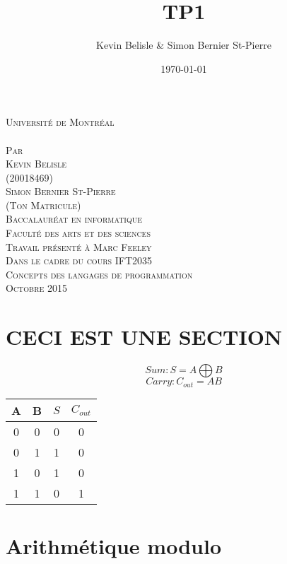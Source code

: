 \documentclass[a4paper,12pt]{article}
\date{\today}
\author{Kevin Belisle \& Simon Bernier St-Pierre}
\title{TP1}
\newcommand{\Teacher}{Marc Feeley}
\newcommand{\ClassNum}{IFT2035}
\newcommand{\ClassName}{Concepts des langages de programmation}
\newcommand{\DateMMMMYYYY}{Octobre 2015}
\newcommand{\Author}{Kevin Belisle}
\newcommand{\Authorr}{Simon Bernier St-Pierre}
\begin{document}
\begin{titlepage} 
	\begin{center}
		\textsc{\normalsize Université de Montréal}\\[2.5cm]
		
		\textsc{\LARGE \@title}\\[2.5cm]
		
		\textsc{\small Par}\\[0.25cm]
		\textsc{\LARGE \Author}\\[0.25cm]
		\textsc{\normalsize (20018469)}\\[0.25cm]
		\textsc{\LARGE \Authorr}\\[0.25cm]
		\textsc{\normalsize (Ton Matricule)}\\[2.5cm]
		
		\textsc{\normalsize Baccalauréat en informatique}\\
		\textsc{\normalsize Faculté des arts et des sciences}\\[2.5cm]
		
		\textsc{\small Travail présenté à \Teacher}\\
		\textsc{\small Dans le cadre du cours \ClassNum}\\
		\textsc{\small \ClassName}\\[2.5cm]
		
		\textsc{\normalsize \DateMMMMYYYY}\\[1.5cm]
	\end{center}
\end{titlepage}
\section{CECI EST UNE SECTION }
	\[Sum: S = A \bigoplus B\]
	\[Carry: C_{out} = AB\]
	\begin{tabular}{cc | cc}
		A&B&$S$&$C_{out}$\\
		\hline
		0&0&0&0\\
		0&1&1&0\\
		1&0&1&0\\
		1&1&0&1\\
	\end{tabular}
\section{Arithmétique modulo}
\end{document}
